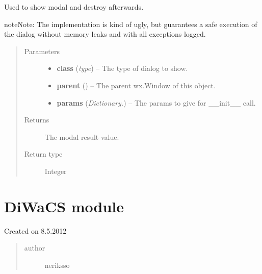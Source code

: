 \documentclass[letterpaper,10pt,english]{sphinxmanual}
\begin{document}
\begin{fulllineitems}
\begin{fulllineitems}
\begin{quote}
\begin{description}
\end{description}\end{quote}

\end{fulllineitems}


\end{fulllineitems}


\begin{fulllineitems}
\label{dialogs:dialogs.show_modal_and_destroy}
Used to show modal and destroy afterwards.

\begin{notice}{note}{Note:}
The implementation is kind of ugly, but guarantees a safe execution
of the dialog without memory leaks and with all exceptions logged.
\end{notice}
\begin{quote}\begin{description}
\item[{Parameters}] \leavevmode\begin{itemize}
\item {} 
\textbf{class} (\emph{type}) -- The type of dialog to show.

\item {} 
\textbf{parent} () -- The parent wx.Window of this object.

\item {} 
\textbf{params} (\emph{Dictionary.}) -- The params to give for \_\_init\_\_ call.

\end{itemize}

\item[{Returns}] \leavevmode
The modal result value.

\item[{Return type}] \leavevmode
Integer

\end{description}\end{quote}

\end{fulllineitems}



\section{DiWaCS module}
\label{diwacs:diwacs-module}\label{diwacs:module-diwacs}\label{diwacs::doc}
Created on 8.5.2012
\begin{quote}\begin{description}
\item[{author}] \leavevmode
neriksso

\end{description}\end{quote}
\end{document}
